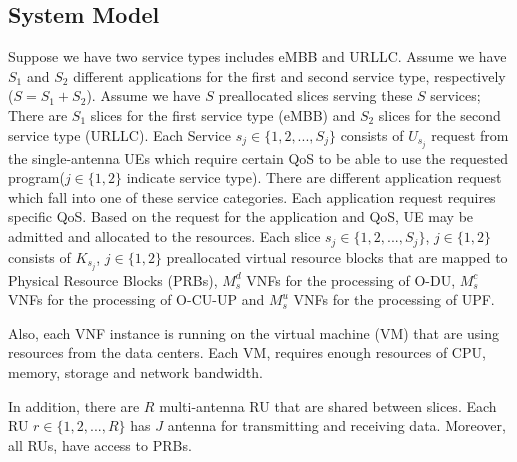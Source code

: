 \documentclass[conference]{IEEEtran}
\begin{document}
\subsection{System Model}
Suppose we have two service types includes eMBB and URLLC. Assume we have $S_1$ and $S_2$ different applications for the first and second service type, respectively ($S = S_1 + S_2$).
Assume we have $S$ preallocated slices serving these $S$ services; There are $S_1$ slices for the first service type (eMBB) and $S_2$ slices for the second service type (URLLC).
Each Service $s_j\in \{1,2,...,S_j \} $ consists of $U_{s_j}$ request from the 
single-antenna UEs which require certain QoS to be able to use the requested program($j \in \{1,2\}$ indicate service type).
There are different application request which fall into one of these service categories. Each application request requires specific QoS. Based on the request for the application and QoS, UE may be admitted and allocated to the resources.
Each slice $s_j \in \{1,2,...,S_j \}$, $j \in \{1,2\}$ consists of $K_{s_j}$, $j \in \{1,2\}$ preallocated virtual resource blocks that are mapped to Physical Resource Blocks (PRBs), $M_s^{d}$ VNFs for the processing of O-DU,  $M_s^{c}$ VNFs for the processing of O-CU-UP and $M_s^{u}$ VNFs for the processing of UPF.

Also, each VNF instance is running on the virtual machine (VM) that are using resources from the data centers. Each VM, requires enough resources of CPU, memory, storage and network bandwidth.

In addition, there are $R$ multi-antenna RU that are shared between slices. Each RU $r \in \{1,2,...,R \}$
has $J$ antenna for transmitting and receiving data. Moreover, all RUs, have access to PRBs.
\end{document}
